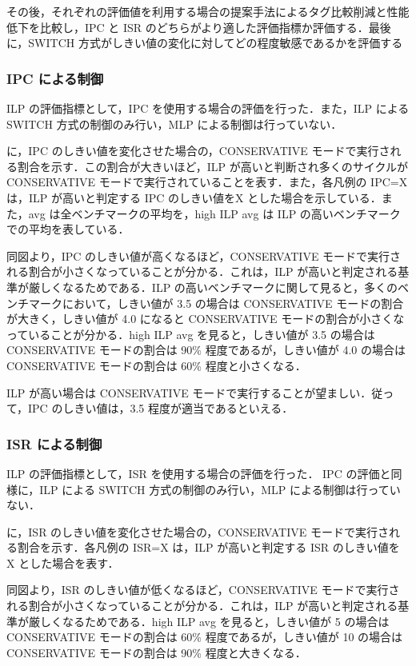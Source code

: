 その後，それぞれの評価値を利用する場合の提案手法によるタグ比較削減と性能低下を比較し，IPC と ISR のどちらがより適した評価指標か評価する．最後に，SWITCH 方式がしきい値の変化に対してどの程度敏感であるかを評価する

\subsubsection{IPC による制御}
ILP の評価指標として，IPC を使用する場合の評価を行った．また，ILP による SWITCH 方式の制御のみ行い，MLP による制御は行っていない．

に，IPC のしきい値を変化させた場合の，CONSERVATIVE モードで実行される割合を示す．この割合が大きいほど，ILP が高いと判断され多くのサイクルが CONSERVATIVE モードで実行されていることを表す．また，各凡例の IPC=X は，ILP が高いと判定する IPC のしきい値をX とした場合を示している．また，avg は全ベンチマークの平均を，high ILP avg は ILP の高いベンチマークでの平均を表している． 

同図より，IPC のしきい値が高くなるほど，CONSERVATIVE モードで実行される割合が小さくなっていることが分かる．これは，ILP が高いと判定される基準が厳しくなるためである．ILP の高いベンチマークに関して見ると，多くのベンチマークにおいて，しきい値が 3.5 の場合は CONSERVATIVE モードの割合が大きく，しきい値が 4.0 になると CONSERVATIVE モードの割合が小さくなっていることが分かる．high ILP avg を見ると，しきい値が 3.5 の場合は CONSERVATIVE モードの割合は 90\% 程度であるが，しきい値が 4.0 の場合は CONSERVATIVE モードの割合は 60\% 程度と小さくなる．

ILP が高い場合は CONSERVATIVE モードで実行することが望ましい．従って，IPC のしきい値は，3.5 程度が適当であるといえる．

\subsubsection{ISR による制御}
ILP の評価指標として，ISR を使用する場合の評価を行った． IPC の評価と同様に，ILP による SWITCH 方式の制御のみ行い，MLP による制御は行っていない．

に，ISR のしきい値を変化させた場合の，CONSERVATIVE モードで実行される割合を示す．各凡例の ISR=X は，ILP が高いと判定する ISR のしきい値を X とした場合を表す．

同図より，ISR のしきい値が低くなるほど，CONSERVATIVE モードで実行される割合が小さくなっていることが分かる．これは，ILP が高いと判定される基準が厳しくなるためである．high ILP avg を見ると，しきい値が 5 の場合は CONSERVATIVE モードの割合は 60\% 程度であるが，しきい値が 10 の場合は CONSERVATIVE モードの割合は 90\% 程度と大きくなる．

